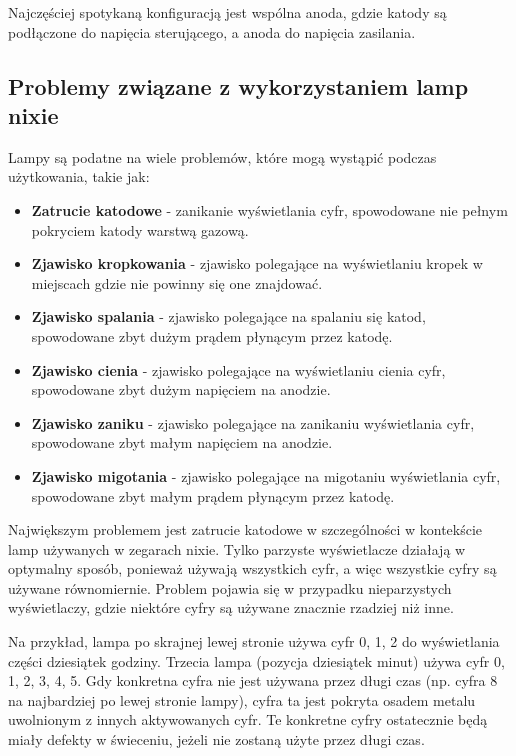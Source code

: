 \documentclass[../main.tex]{subfiles}
\begin{document}
Najczęściej spotykaną konfiguracją jest wspólna anoda, gdzie katody są podłączone do napięcia sterującego, a anoda do napięcia zasilania.

\subsection{Problemy związane z wykorzystaniem lamp nixie}

Lampy są podatne na wiele problemów, które mogą wystąpić podczas użytkowania, takie jak:
\begin{itemize}
  \item \textbf{Zatrucie katodowe} - zanikanie wyświetlania cyfr, spowodowane nie pełnym pokryciem katody warstwą gazową.
  \item \textbf{Zjawisko kropkowania} - zjawisko polegające na wyświetlaniu kropek w miejscach gdzie nie powinny się one znajdować.
  \item \textbf{Zjawisko spalania} - zjawisko polegające na spalaniu się katod, spowodowane zbyt dużym prądem płynącym przez katodę.
  \item \textbf{Zjawisko cienia} - zjawisko polegające na wyświetlaniu cienia cyfr, spowodowane zbyt dużym napięciem na anodzie.
  \item \textbf{Zjawisko zaniku} - zjawisko polegające na zanikaniu wyświetlania cyfr, spowodowane zbyt małym napięciem na anodzie.
  \item \textbf{Zjawisko migotania} - zjawisko polegające na migotaniu wyświetlania cyfr, spowodowane zbyt małym prądem płynącym przez katodę.
\end{itemize}

Największym problemem jest zatrucie katodowe w szczególności w kontekście lamp używanych w zegarach nixie. 
Tylko parzyste wyświetlacze działają w optymalny sposób, ponieważ używają wszystkich cyfr, a więc wszystkie cyfry są używane równomiernie.
Problem pojawia się w przypadku nieparzystych wyświetlaczy, gdzie niektóre cyfry są używane znacznie rzadziej niż inne.

Na przykład, lampa po skrajnej lewej stronie używa cyfr 0, 1, 2 do wyświetlania części dziesiątek godziny.
Trzecia lampa (pozycja dziesiątek minut) używa cyfr 0, 1, 2, 3, 4, 5. Gdy konkretna cyfra nie jest używana przez długi czas (np. cyfra 8 na najbardziej po lewej stronie lampy),
cyfra ta jest pokryta osadem metalu uwolnionym z innych aktywowanych cyfr. Te konkretne cyfry ostatecznie będą miały defekty w świeceniu, jeżeli nie zostaną użyte przez długi czas.
\end{document}
